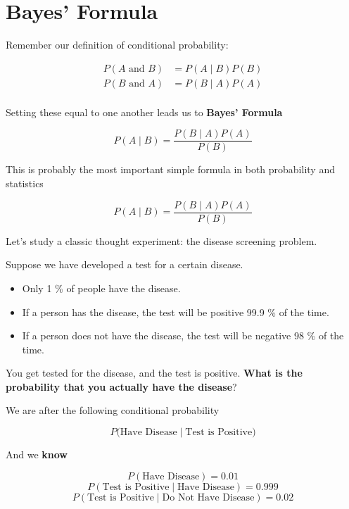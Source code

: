 \section{Bayes' Formula}

%
\begin{frame}
Remember our definition of conditional probability:

\begin{align*}
P(A \text{ and } B) &= P(A \mid B) P(B) \\
P(B \text{ and } A) &= P(B \mid A) P(A) \\
\end{align*}

Setting these equal to one another leads us to \textbf{Bayes' Formula}

$$ P(A \mid B) = \frac{ P(B \mid A) P(A) }{ P(B) } $$

\end{frame}
%

%
\begin{frame}

This is probably the most important simple formula in both probability and
statistics

$$ P(A \mid B) = \frac{ P(B \mid A) P(A) }{ P(B) } $$

\end{frame}
%

%
\begin{frame}

Let's study a classic thought experiment: the disease screening problem.

Suppose we have developed a test for a certain disease.
\begin{itemize}
\item Only 1 \% of people have the disease.
\item If a person has the disease, the test will be positive 99.9 \% of the
time.
\item If a person does not have the disease, the test will be negative 98 \% of
the time.
\end{itemize}

You get tested for the disease, and the test is positive.  \textbf{What is the
probability that you actually have the disease}?

\end{frame}
%

%
\begin{frame}
We are after the following conditional probability

$$ P(\text{Have Disease} \mid \text{Test is Positive)} $$

And we \textbf{know}

$$ P(\text{Have Disease}) = 0.01 $$
$$ P(\text{Test is Positive} \mid \text{Have Disease}) = 0.999 $$
$$ P(\text{Test is Positive} \mid \text{Do Not Have Disease}) = 0.02 $$
\end{frame}
%

